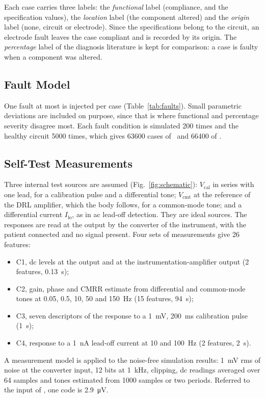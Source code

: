 

Each case carries three labels: the \emph{functional} label (compliance, and the specification
values), the \emph{location} label (the component altered) and the \emph{origin} label (none,
circuit or electrode). Since the specifications belong to the circuit, an electrode fault leaves
the case compliant and is recorded by its origin. The \emph{percentage} label of the diagnosis
literature is kept for comparison: a case is faulty when a component was altered.

\subsection{Fault Model}

One fault at most is injected per case (Table~\ref{tab:faults}). Small parametric deviations are
included on purpose, since that is where functional and percentage severity disagree most. Each
fault condition is simulated 200 times and the healthy circuit \num{5000} times, which gives
\num{63600} cases of \cA\ and \num{66400} of \cB.



\subsection{Self-Test Measurements}
\label{sec:measurements}

Three internal test sources are assumed (Fig.~\ref{fig:schematic}): $V_\mathrm{cal}$ in series
with one lead, for a calibration pulse and a differential tone; $V_\mathrm{cmt}$ at the reference
of the DRL amplifier, which the body follows, for a common-mode tone; and a differential current
$I_\mathrm{lo}$, as in ac lead-off detection. They are ideal sources. The responses are read at
the output by the converter of the instrument, with the patient connected and no signal present.
Four sets of measurements give 26 features:
\begin{itemize}
\item C1, dc levels at the output and at the instrumentation-amplifier output (2 features,
\SI{0.13}{\second});
\item C2, gain, phase and CMRR estimate from differential and common-mode tones at 0.05, 0.5, 10,
50 and \SI{150}{\hertz} (15 features, \SI{94}{\second});
\item C3, seven descriptors of the response to a \SI{1}{\milli\volt}, \SI{200}{\milli\second}
calibration pulse (\SI{1}{\second});
\item C4, response to a \SI{1}{\nano\ampere} lead-off current at 10 and \SI{100}{\hertz}
(2 features, \SI{2}{\second}).
\end{itemize}
A measurement model is applied to the noise-free simulation results: \SI{1}{\milli\volt} rms of
noise at the converter input, 12 bits at \SI{1}{\kilo\hertz}, clipping, dc readings averaged over
64 samples and tones estimated from \num{1000} samples or two periods. Referred to the input of
\cA, one code is \SI{2.9}{\micro\volt}.

